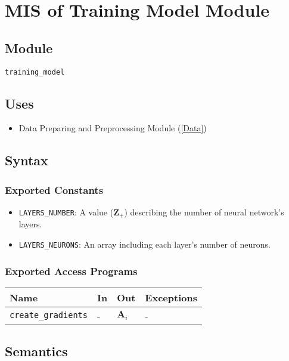 \documentclass[12pt, titlepage]{article}
\def\code#1{\texttt{#1}}
\begin{document}
\newpage

\section{MIS of Training Model Module} \label{Train-Model} 

\subsection{Module}
\code{training\_model} 

\subsection{Uses}
\begin{itemize}
  \item Data Preparing and Preprocessing Module (\ref{Data})
\end{itemize}


\subsection{Syntax}
\subsubsection{Exported Constants}
\begin{itemize}
  \item \code{LAYERS\_NUMBER}: A value ($\mathbf{Z}_{+}$) describing the number of 
  neural network's layers.
  \item \code{LAYERS\_NEURONS}: An array including each layer's number of neurons.
\end{itemize}

\subsubsection{Exported Access Programs}

\begin{center}
\begin{tabular}{p{3.5cm} p{4cm} p{4cm} p{3.5cm}}
\hline
\textbf{Name} & \textbf{In} & \textbf{Out} & \textbf{Exceptions} \\
\hline
\code{create\_gradients} & - & $\mathbf{A}_{i}$ & - \\
\hline
\end{tabular}
\end{center}

\subsection{Semantics}
\end{document}
